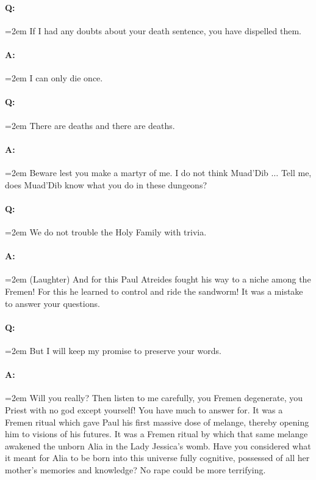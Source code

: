 \documentclass[a4paper, 12pt, oldfontcommands, final]{memoir}
\begin{document}
\paragraph{Q:} \hangindent=2em If I had any doubts about your death sentence, you have dispelled them.
\paragraph{A:} \hangindent=2em I can only die once.
\paragraph{Q:} \hangindent=2em There are deaths and there are deaths.
\paragraph{A:} \hangindent=2em Beware lest you make a martyr of me. I do not think Muad'Dib $\ldots$ Tell me, does Muad'Dib know what you do in these dungeons?
\paragraph{Q:} \hangindent=2em We do not trouble the Holy Family with trivia.
\paragraph{A:} \hangindent=2em (Laughter) And for this Paul Atreides fought his way to a niche among the Fremen! For this he learned to control and ride the sandworm! It was a mistake to answer your questions.
\paragraph{Q:} \hangindent=2em But I will keep my promise to preserve your words.
\paragraph{A:} \hangindent=2em Will you really? Then listen to me carefully, you Fremen degenerate, you Priest with no god except yourself! You have much to answer for. It was a Fremen ritual which gave Paul his first massive dose of melange, thereby opening him to visions of his futures. It was a Fremen ritual by which that same melange awakened the unborn Alia in the Lady Jessica's womb. Have you considered what it meant for Alia to be born into this universe fully cognitive, possessed of all her mother's memories and knowledge? No rape could be more terrifying.
\end{document}

